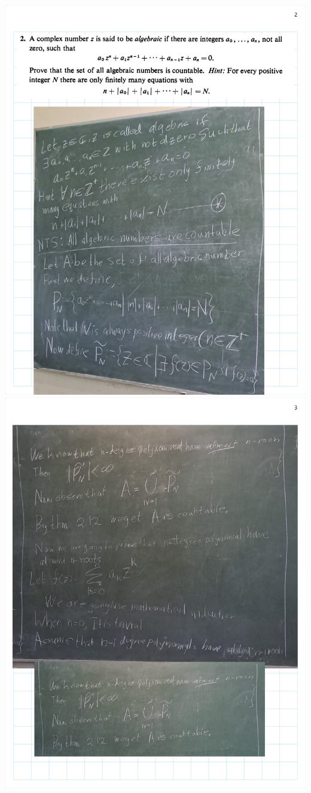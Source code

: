 \documentclass[
]{book}
\theoremstyle{definition}
\theoremstyle{definition}
\theoremstyle{definition}
\theoremstyle{definition}
\theoremstyle{remark}
\begin{document}
\includegraphics{Figures/Ex-2/Rudin Ch2-2.png}
\includegraphics{Figures/Ex-2/Rudin Ch2-3.png}
\end{document}
